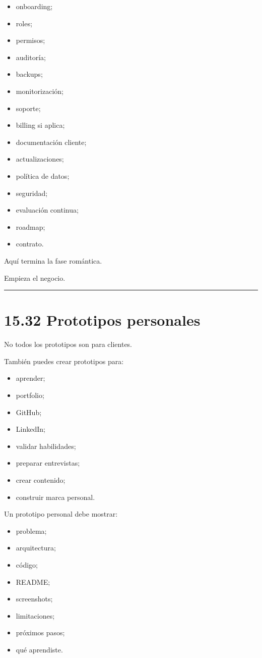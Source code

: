 \begin{itemize}
\tightlist
\item
  onboarding;
\item
  roles;
\item
  permisos;
\item
  auditoría;
\item
  backups;
\item
  monitorización;
\item
  soporte;
\item
  billing si aplica;
\item
  documentación cliente;
\item
  actualizaciones;
\item
  política de datos;
\item
  seguridad;
\item
  evaluación continua;
\item
  roadmap;
\item
  contrato.
\end{itemize}

Aquí termina la fase romántica.

Empieza el negocio.

\begin{center}\rule{0.5\linewidth}{0.5pt}\end{center}

\section{15.32 Prototipos personales}\label{prototipos-personales}

No todos los prototipos son para clientes.

También puedes crear prototipos para:

\begin{itemize}
\tightlist
\item
  aprender;
\item
  portfolio;
\item
  GitHub;
\item
  LinkedIn;
\item
  validar habilidades;
\item
  preparar entrevistas;
\item
  crear contenido;
\item
  construir marca personal.
\end{itemize}

Un prototipo personal debe mostrar:

\begin{itemize}
\tightlist
\item
  problema;
\item
  arquitectura;
\item
  código;
\item
  README;
\item
  screenshots;
\item
  limitaciones;
\item
  próximos pasos;
\item
  qué aprendiste.
\end{itemize}

